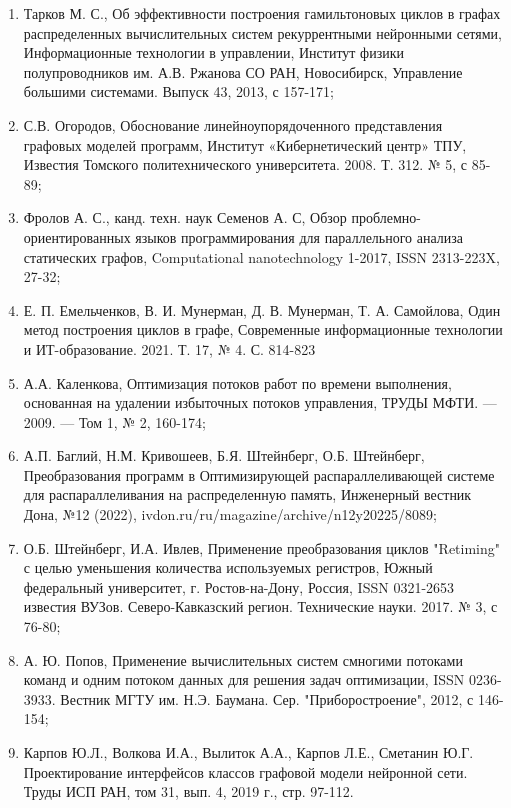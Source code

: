 \begin{enumerate}
    \item Тарков М. С., Об эффективности построения гамильтоновых циклов в графах распределенных вычислительных систем рекуррентными нейронными сетями, Информационные технологии в управлении, Институт физики полупроводников им. А.В. Ржанова СО РАН, Новосибирск, Управление большими системами. Выпуск 43, 2013, с 157-171;
    \item С.В. Огородов, Обоснование линейноупорядоченного представления графовых моделей программ, Институт «Кибернетический центр» ТПУ, Известия Томского политехнического университета. 2008. Т. 312. № 5, с 85-89;
    \item Фролов А. С., канд. техн. наук Семенов А. С, Обзор проблемно-ориентированных языков программирования для параллельного анализа статических графов, Computational nanotechnology 1-2017, ISSN 2313-223X, 27-32;
    \item Е. П. Емельченков, В. И. Мунерман, Д. В. Мунерман, Т. А. Самойлова, Один метод построения циклов в графе, Современные информационные технологии и ИТ-образование. 2021. Т. 17, № 4. С. 814-823 
    \item А.А. Каленкова, Оптимизация потоков работ по времени выполнения, основанная на удалении избыточных потоков управления, ТРУДЫ МФТИ. — 2009. — Том 1, № 2, 160-174;
    \item А.П. Баглий, Н.М. Кривошеев, Б.Я. Штейнберг, О.Б. Штейнберг, Преобразования программ в Оптимизирующей распараллеливающей системе для распараллеливания на распределенную память, Инженерный вестник Дона, №12 (2022), ivdon.ru/ru/magazine/archive/n12y20225/8089;
    \item О.Б. Штейнберг, И.А. Ивлев, Применение преобразования циклов "Retiming" с целью уменьшения количества используемых регистров, Южный федеральный университет, г. Ростов-на-Дону, Россия, ISSN 0321-2653 известия ВУЗов. Северо-Кавказский регион. Технические науки. 2017. № 3, с 76-80;
    \item А. Ю. Попов, Применение вычислительных систем смногими потоками команд и одним потоком данных для решения задач оптимизации, ISSN 0236-3933. Вестник МГТУ им. Н.Э. Баумана. Сер. "Приборостроение", 2012, с 146-154; 
    \item Карпов Ю.Л., Волкова И.А., Вылиток А.А., Карпов Л.Е., Сметанин Ю.Г. Проектирование интерфейсов классов графовой модели нейронной сети. Труды ИСП РАН, том 31, вып. 4, 2019 г., стр. 97-112.
\end{enumerate}